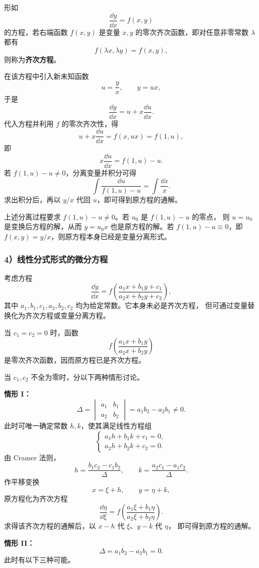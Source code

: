 形如
\[
	\dfrac{\dd y}{\dd x}=f(x,y)
\]
的方程，若右端函数 $f(x,y)$ 是变量 $x,y$ 的零次齐次函数，即对任意非零常数 $\lambda$ 都有
\[
	f(\lambda x,\lambda y)=f(x,y),
\]
则称为\textbf{齐次方程}。

在该方程中引入新未知函数
\[
	u=\dfrac{y}{x},
	\qquad y=ux,
\]
于是
\[
	\dfrac{\dd y}{\dd x}=u+x\dfrac{\dd u}{\dd x}.
\]
代入方程并利用 $f$ 的零次齐次性，得
\[
	u+x\dfrac{\dd u}{\dd x}=f(x,ux)=f(1,u),
\]
即
\[
	x\dfrac{\dd u}{\dd x}=f(1,u)-u.
\]
若 $f(1,u)-u\neq 0$，分离变量并积分可得
\[
	\int\dfrac{\dd u}{f(1,u)-u}=\int\dfrac{\dd x}{x}.
\]
求出积分后，再以 $y/x$ 代回 $u$，即可得到原方程的通解。

上述分离过程要求 $f(1,u)-u\neq 0$。若 $u_0$ 是 $f(1,u)-u$ 的零点，
则 $u=u_0$ 是变换后方程的解，从而 $y=u_0x$ 也是原方程的解。若
$f(1,u)-u\equiv 0$，即 $f(x,y)=y/x$，则原方程本身已经是变量分离形式。

\subsubsection*{4）线性分式形式的微分方程}

考虑方程
\[
	\dfrac{\dd y}{\dd x}
	=f\left(\dfrac{a_1x+b_1y+c_1}{a_2x+b_2y+c_2}\right),
\]
其中 $a_1,b_1,c_1,a_2,b_2,c_2$ 均为给定常数。它本身未必是齐次方程，
但可通过变量替换化为齐次方程或变量分离方程。

当 $c_1=c_2=0$ 时，函数
\[
	f\left(\dfrac{a_1x+b_1y}{a_2x+b_2y}\right)
\]
是零次齐次函数，因而原方程已是齐次方程。

当 $c_1,c_2$ 不全为零时，分以下两种情形讨论。

\textbf{情形 I：}
\[
	\Delta=
	\begin{vmatrix}
		a_1 & b_1\\
		a_2 & b_2
	\end{vmatrix}
	=a_1b_2-a_2b_1\neq 0.
\]
此时可唯一确定常数 $h,k$，使其满足线性方程组
\[
	\begin{cases}
		a_1h+b_1k+c_1=0,\\
		a_2h+b_2k+c_2=0.
	\end{cases}
\]
由 Cramer 法则，
\[
	h=\dfrac{b_1c_2-c_1b_2}{\Delta},
	\qquad
	k=\dfrac{a_2c_1-a_1c_2}{\Delta}.
\]
作平移变换
\[
	x=\xi+h,
	\qquad
	y=\eta+k,
\]
原方程化为齐次方程
\[
	\dfrac{\dd\eta}{\dd\xi}
	=f\left(\dfrac{a_1\xi+b_1\eta}{a_2\xi+b_2\eta}\right).
\]
求得该齐次方程的通解后，以 $x-h$ 代 $\xi$、$y-k$ 代 $\eta$，
即可得到原方程的通解。

\textbf{情形 II：}
\[
	\Delta=a_1b_2-a_2b_1=0.
\]
此时有以下三种可能。

